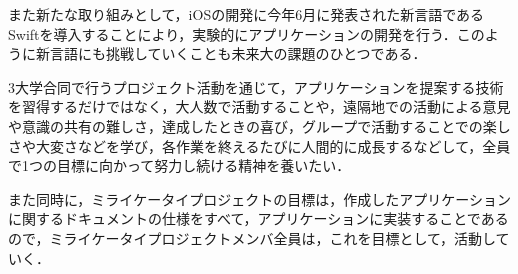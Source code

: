 \par
また新たな取り組みとして，iOSの開発に今年6月に発表された新言語であるSwiftを導入することにより，実験的にアプリケーションの開発を行う．このように新言語にも挑戦していくことも未来大の課題のひとつである．
\par
3大学合同で行うプロジェクト活動を通じて，アプリケーションを提案する技術を習得するだけではなく，大人数で活動することや，遠隔地での活動による意見や意識の共有の難しさ，達成したときの喜び，グループで活動することでの楽しさや大変さなどを学び，各作業を終えるたびに人間的に成長するなどして，全員で1つの目標に向かって努力し続ける精神を養いたい．
\par
また同時に，ミライケータイプロジェクトの目標は，作成したアプリケーションに関するドキュメントの仕様をすべて，アプリケーションに実装することであるので，ミライケータイプロジェクトメンバ全員は，これを目標として，活動していく．
